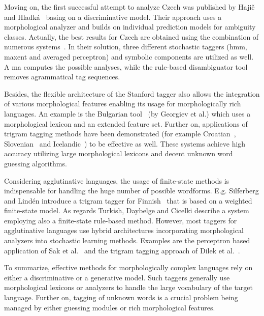 Moving on, the first successful attempt to analyze Czech was published by Hajič and Hladká~\cite{Hajic1998a} basing on a discriminative model.
Their approach uses a morphological analyzer and builds on individual prediction models for ambiguity classes.
Actually, the best results for Czech are obtained using the combination of numerous systems~\cite{Hajic2007}.
In their solution, three different stochastic taggers (\acrshort{hmm}, \acrlong{maxent} and averaged perceptron) and symbolic components are utilized as well.
A \acrshort{ma} computes the possible analyses, while the rule-based disambiguator tool removes agrammatical tag sequences. 

Besides, the flexible architecture of the Stanford tagger \cite{Toutanova2003} also allows the integration of various morphological features enabling its usage for morphologically rich languages.
An example is the Bulgarian tool~\cite{Georgiev2012} (by Georgiev et al.) which uses a morphological lexicon and an extended feature set.
Further on, applications of trigram tagging methods \cite{Brants2000,Halacsy2007} have been demonstrated (for example Croatian~\cite{Agic2013}, Slovenian~\cite{Agic2013} and Icelandic~\cite{Loftsson2007}) to be effective as well.
These systems achieve high accuracy utilizing large morphological lexicons and decent unknown word guessing algorithms.

Considering agglutinative languages, the usage of finite-state methods is indispensable for handling the huge number of possible wordforms.
E.g. Silferberg and Lindén introduce a trigram tagger for Finnish~\cite{Silfverberg2011} that is based on a weighted finite-state model.
As regards Turkish, Daybelge and Cicelki describe a system~\cite{Daybelge2007} employing also a finite-state rule-based method.
However, most taggers for agglutinative languages use hybrid architectures incorporating morphological analyzers into stochastic learning methods.
Examples are the perceptron based application of Sak et al.~\cite{Sak2007} and the trigram tagging approach of Dilek et al.~\cite{Hakkani-Tur2002}.

To summarize, effective methods for morphologically complex languages rely on either a discriminative or a generative model.
Such taggers generally use morphological lexicons or analyzers to handle the large vocabulary of the target language.
Further on, tagging of unknown words is a crucial problem being managed by either guessing modules or rich morphological features. 

